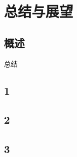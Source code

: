 \chapter{总结与展望}\label{chap:summaryandoutlook}

\section{概述}

总结

\section{1}\label{sec:1}

\section{2}

\section{3}

